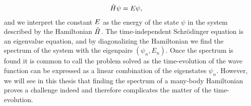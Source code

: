         \begin{align}
            \hat{H}\psi = E\psi,
        \end{align}
        and we interpret the constant $E$ as the energy of the state
        $\psi$ in the system described by the Hamiltonian $\hat{H}$.
        The time-independent Schrödinger equation is an eigenvalue equation, and
        by diagonalizing the Hamiltonian we find the spectrum of the system with
        the eigenpairs $(\psi_n, E_n)$.
        Once the spectrum is found it is common to call the problem solved as
        the time-evolution of the wave function can be expressed as a linear
        combination of the eigenstates $\psi_n$.
        However, we will see in this thesis that finding the spectrum of a
        many-body Hamiltonian proves a challenge indeed and therefore
        complicates the matter of the time-evolution.

